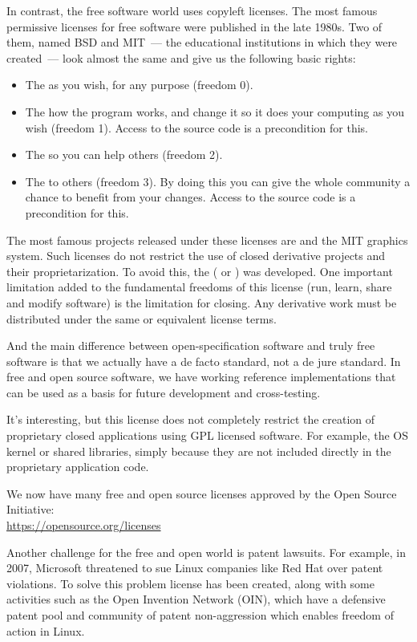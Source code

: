 In contrast, the free software world uses copyleft licenses. The most famous
permissive licenses for free software were published in the late 1980s.
Two of them, named BSD and MIT~--- the educational institutions in which
they were created~--- look almost the same and give us the following basic rights:
\begin{itemize}
\item The  as you wish, for any purpose
      (freedom 0).
\item The  how the program works, and change it so
      it does your computing as you wish (freedom 1). Access to the source code
      is a precondition for this.
\item The  so you can help others
      (freedom 2).
\item The 
      to others (freedom 3). By doing this you can give the whole community
      a chance to benefit from your changes. Access to the source code is
      a precondition for this.
\end{itemize}

The most famous projects released under these licenses are  and
the MIT  graphics system. Such licenses do not restrict
the use of closed derivative projects and their proprietarization.
To avoid this, the  ( or
) was developed. One important limitation added to the fundamental
freedoms of this license (run, learn, share and modify software) is
the limitation for closing. Any derivative work must be distributed under
the same or equivalent license terms.

And the main difference between open-specification software and truly free
software is that we actually have a de facto standard, not a de jure standard.
In free and open source software, we have working reference implementations that
can be used as a basis for future development and cross-testing. %

It's interesting, but this license does not completely restrict the creation of
proprietary closed applications using GPL licensed software. For example,
the OS kernel or shared libraries, simply because they are not included
directly in the proprietary application code.

We now have many free and open source licenses approved by
the Open Source Initiative:\\
\href{https://opensource.org/licenses}{\url{https://opensource.org/licenses}}

Another challenge for the free and open world is patent lawsuits.
For example, in 2007, Microsoft threatened to sue Linux companies like Red Hat
over patent violations. To solve this problem  license has been
created, along with some activities such as the Open Invention Network (OIN),
which have a defensive patent pool and community of patent non-aggression
which enables freedom of action in Linux.
